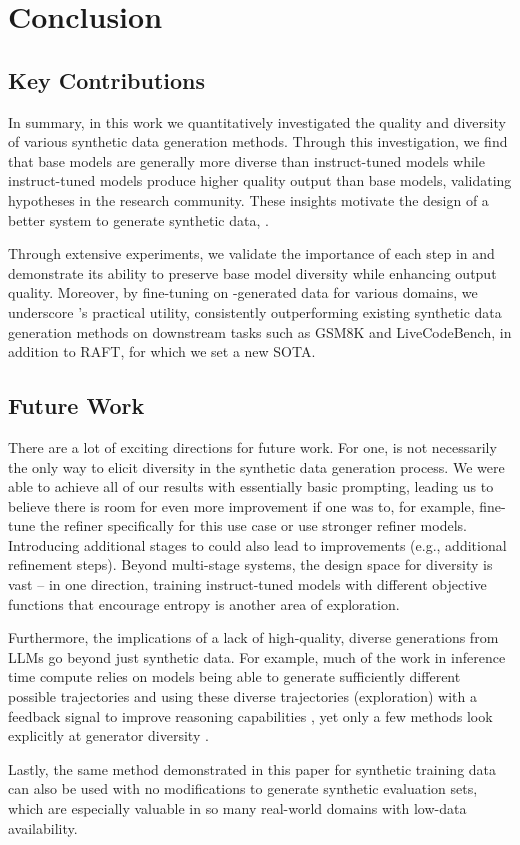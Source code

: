 \section{Conclusion}

\subsection{Key Contributions}

In summary, in this work we quantitatively investigated the quality and diversity of various synthetic data generation methods. Through this investigation, we find that base models are generally more diverse than instruct-tuned models while instruct-tuned models produce higher quality output than base models, validating hypotheses in the research community. These insights motivate the design of a better system to generate synthetic data, \Sys{}.

Through extensive experiments, we validate the importance of each step in \Sys{} and demonstrate its ability to preserve base model diversity while enhancing output quality. Moreover, by fine-tuning on \Sys{}-generated data for various domains, we underscore \Sys{}’s practical utility, consistently outperforming existing synthetic data generation methods on downstream tasks such as GSM8K and LiveCodeBench, in addition to RAFT, for which we set a new SOTA. 

\subsection{Future Work}

There are a lot of exciting directions for future work. For one, \Sys{} is not necessarily the only way to elicit diversity in the synthetic data generation process. We were able to achieve all of our results with essentially basic prompting, leading us to believe there is room for even more improvement if one was to, for example, fine-tune the refiner specifically for this use case or use stronger refiner models. Introducing additional stages to \Sys{} could also lead to improvements (e.g., additional refinement steps). Beyond multi-stage systems, the design space for diversity is vast -- in one direction, training instruct-tuned models with different objective functions that encourage entropy is another area of exploration.

Furthermore, the implications of a lack of high-quality, diverse generations from LLMs go beyond just synthetic data. For example, much of the work in inference time compute relies on models being able to generate sufficiently different possible trajectories and using these diverse trajectories (exploration) with a feedback signal to improve reasoning capabilities \cite{zhang2024accessing, zelikman2022starbootstrappingreasoningreasoning}, yet only a few methods look explicitly at generator diversity \cite{wang2024planning}.

Lastly, the same \Sys{} method demonstrated in this paper for synthetic training data can also be used with no modifications to generate synthetic evaluation sets, which are especially valuable in so many real-world domains with low-data availability.
